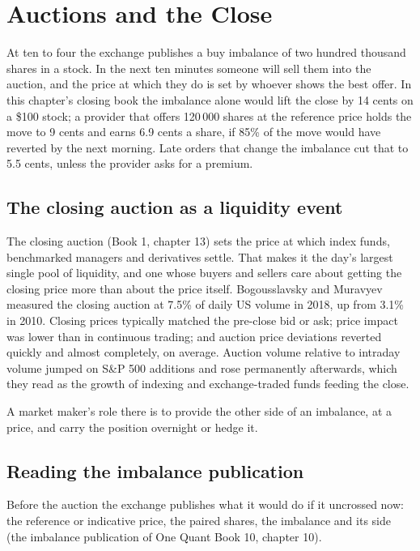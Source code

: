 \chapter{Auctions and the Close}\label{ch:hf:auctions-and-the-close}

At ten to four the exchange publishes a buy imbalance of two hundred thousand shares in a stock. In the next ten minutes someone will sell them
into the auction, and the price at which they do is set by whoever shows the best offer. In this chapter's closing book the imbalance alone would
lift the close by 14 cents on a \$100 stock; a provider that offers 120\,000 shares at the reference price holds the move to 9 cents and earns 6.9
cents a share, if 85\% of the move would have reverted by the next morning. Late orders that change the imbalance cut that to 5.5 cents, unless the
provider asks for a premium.

\section{The closing auction as a liquidity event}

The closing auction (Book 1, chapter 13) sets the price at which index funds, benchmarked managers and derivatives settle. That makes it the day's
largest single pool of liquidity, and one whose buyers and sellers care about getting the closing price more than about the price itself.
Bogousslavsky and Muravyev measured the closing auction at 7.5\% of daily US volume in 2018, up from 3.1\% in 2010. Closing prices typically matched
the pre-close bid or ask; price impact was lower than in continuous trading; and auction price deviations reverted quickly and almost completely, on
average. Auction volume relative to intraday volume jumped on S\&P 500 additions and rose permanently afterwards, which they read as the growth of
indexing and exchange-traded funds feeding the close.

A market maker's role there is to provide the other side of an imbalance, at a price, and carry the position overnight or hedge it.

\section{Reading the imbalance publication}

Before the auction the exchange publishes what it would do if it uncrossed now: the reference or indicative price, the paired shares, the
imbalance and its side (the imbalance publication of One Quant Book 10, chapter 10).

